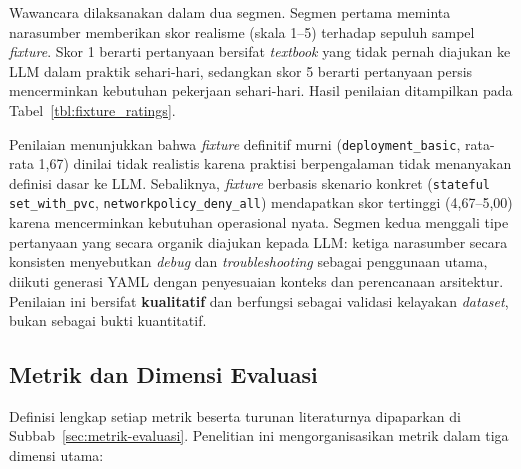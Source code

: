 

Wawancara dilaksanakan dalam dua segmen. Segmen pertama meminta narasumber memberikan skor realisme (skala 1--5) terhadap sepuluh sampel \textit{fixture}. Skor 1 berarti pertanyaan bersifat \textit{textbook} yang tidak pernah diajukan ke LLM dalam praktik sehari-hari, sedangkan skor 5 berarti pertanyaan persis mencerminkan kebutuhan pekerjaan sehari-hari. Hasil penilaian ditampilkan pada Tabel~\ref{tbl:fixture_ratings}.



Penilaian menunjukkan bahwa \textit{fixture} definitif murni (\texttt{deployment\_basic}, rata-rata 1,67) dinilai tidak realistis karena praktisi berpengalaman tidak menanyakan definisi dasar ke LLM. Sebaliknya, \textit{fixture} berbasis skenario konkret (\texttt{stateful set\_with\_pvc}, \texttt{networkpolicy\_deny\_all}) mendapatkan skor tertinggi (4,67--5,00) karena mencerminkan kebutuhan operasional nyata. Segmen kedua menggali tipe pertanyaan yang secara organik diajukan kepada LLM: ketiga narasumber secara konsisten menyebutkan \textit{debug} dan \textit{troubleshooting} sebagai penggunaan utama, diikuti generasi YAML dengan penyesuaian konteks dan perencanaan arsitektur. Penilaian ini bersifat \textbf{kualitatif} dan berfungsi sebagai validasi kelayakan \textit{dataset}, bukan sebagai bukti kuantitatif.

\subsection{Metrik dan Dimensi Evaluasi}
\label{subsec:metrik-evaluasi-bab6}

Definisi lengkap setiap metrik beserta turunan literaturnya dipaparkan di Subbab~\ref{sec:metrik-evaluasi}. Penelitian ini mengorganisasikan metrik dalam tiga dimensi utama:

